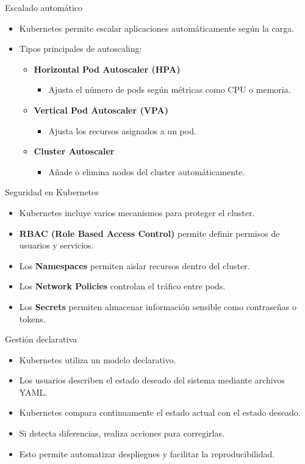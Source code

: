 \documentclass{beamer}
\begin{document}
\begin{frame}{Escalado automático}
\begin{itemize}
\item Kubernetes permite escalar aplicaciones automáticamente según la carga.
\item Tipos principales de autoscaling:
\begin{itemize}
\item \textbf{Horizontal Pod Autoscaler (HPA)}
\begin{itemize}
\item Ajusta el número de pods según métricas como CPU o memoria.
\end{itemize}
\item \textbf{Vertical Pod Autoscaler (VPA)}
\begin{itemize}
\item Ajusta los recursos asignados a un pod.
\end{itemize}
\item \textbf{Cluster Autoscaler}
\begin{itemize}
\item Añade o elimina nodos del cluster automáticamente.
\end{itemize}
\end{itemize}
\end{itemize}
\end{frame}

\begin{frame}{Seguridad en Kubernetes}
\begin{itemize}
\item Kubernetes incluye varios mecanismos para proteger el cluster.
\item \textbf{RBAC (Role Based Access Control)} permite definir permisos de usuarios y servicios.
\item Los \textbf{Namespaces} permiten aislar recursos dentro del cluster.
\item Los \textbf{Network Policies} controlan el tráfico entre pods.
\item Los \textbf{Secrets} permiten almacenar información sensible como contraseñas o tokens.
\end{itemize}
\end{frame}

\begin{frame}{Gestión declarativa}
\begin{itemize}
\item Kubernetes utiliza un modelo declarativo.
\item Los usuarios describen el estado deseado del sistema mediante archivos YAML.
\item Kubernetes compara continuamente el estado actual con el estado deseado.
\item Si detecta diferencias, realiza acciones para corregirlas.
\item Esto permite automatizar despliegues y facilitar la reproducibilidad.
\end{itemize}
\end{frame}
\end{document}

